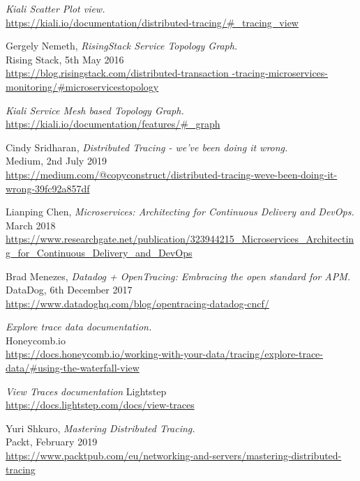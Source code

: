 \documentclass[pdftex,titlepage]{article}
\begin{document}
\begin{thebibliography}{20}
        \textit{Kiali Scatter Plot view.} \\
        \url{https://kiali.io/documentation/distributed-tracing/#_tracing_view}

        Gergely Nemeth, \textit{RisingStack Service Topology Graph.} \\
        Rising Stack, 5th May 2016 \\
        \url{https://blog.risingstack.com/distributed-transaction -tracing-microservices-monitoring/#microservicestopology}

        \textit{Kiali Service Mesh based Topology Graph.} \\
        \url{https://kiali.io/documentation/features/#_graph}

        Cindy Sridharan, \textit{Distributed Tracing - we've been doing it wrong.} \\
        Medium, 2nd July 2019 \\
        \url{https://medium.com/@copyconstruct/distributed-tracing-weve-been-doing-it-wrong-39fc92a857df}

        Lianping Chen, \textit{Microservices: Architecting for Continuous Delivery and DevOps.} \\
        March 2018 \\
        \url{https://www.researchgate.net/publication/323944215_Microservices_Architecting_for_Continuous_Delivery_and_DevOps}

        Brad Menezes, \textit{Datadog + OpenTracing: Embracing the open standard for APM.} \\
        DataDog, 6th December 2017 \\
        \url{https://www.datadoghq.com/blog/opentracing-datadog-cncf/}

        \textit{Explore trace data documentation.} \\
        Honeycomb.io \\
        \url{https://docs.honeycomb.io/working-with-your-data/tracing/explore-trace-data/#using-the-waterfall-view}

        \textit{View Traces documentation}
        Lightstep \\ 
        \url{https://docs.lightstep.com/docs/view-traces}

        Yuri Shkuro, \textit{Mastering Distributed Tracing.} \\
        Packt, February 2019 \\
        \url{https://www.packtpub.com/eu/networking-and-servers/mastering-distributed-tracing}
    \end{thebibliography}
\end{document}
